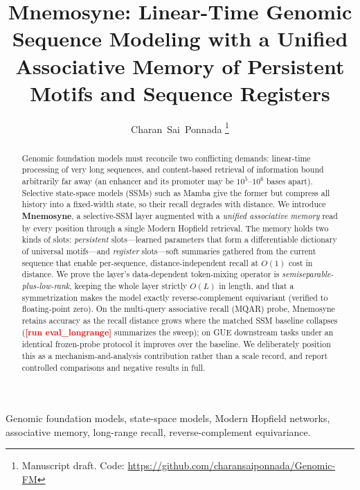 \documentclass[10pt,journal]{IEEEtran}
\newcommand{\longrangeTable}{\textbf{\textcolor{red}{[run eval\_longrange]}}}
\begin{document}
\title{Mnemosyne: Linear-Time Genomic Sequence Modeling with a Unified\\
Associative Memory of Persistent Motifs and Sequence Registers}
\author{Charan~Sai~Ponnada%
\thanks{Manuscript draft. Code: \url{https://github.com/charansaiponnada/Genomic-FM}}}
\maketitle

\begin{abstract}
Genomic foundation models must reconcile two conflicting demands: linear-time
processing of very long sequences, and content-based retrieval of information
bound arbitrarily far away (an enhancer and its promoter may be $10^5$--$10^6$
bases apart). Selective state-space models (SSMs) such as Mamba give the former
but compress all history into a fixed-width state, so their recall degrades with
distance. We introduce \textbf{Mnemosyne}, a selective-SSM layer augmented with a
\emph{unified associative memory} read by every position through a single Modern
Hopfield retrieval. The memory holds two kinds of slots: \emph{persistent}
slots---learned parameters that form a differentiable dictionary of universal
motifs---and \emph{register} slots---soft summaries gathered from the current
sequence that enable per-sequence, distance-independent recall at $O(1)$ cost in
distance. We prove the layer's data-dependent token-mixing operator is
\emph{semiseparable-plus-low-rank}, keeping the whole layer strictly $O(L)$ in
length, and that a symmetrization makes the model exactly reverse-complement
equivariant (verified to floating-point zero). On the multi-query associative
recall (MQAR) probe, Mnemosyne retains accuracy as the recall distance grows
where the matched SSM baseline collapses (\longrangeTable{} summarizes the sweep);
on GUE downstream tasks under an identical frozen-probe protocol it improves over
the baseline. We deliberately position this as a mechanism-and-analysis
contribution rather than a scale record, and report controlled comparisons and
negative results in full.
\end{abstract}

\begin{IEEEkeywords}
Genomic foundation models, state-space models, Modern Hopfield networks,
associative memory, long-range recall, reverse-complement equivariance.
\end{IEEEkeywords}
\end{document}
